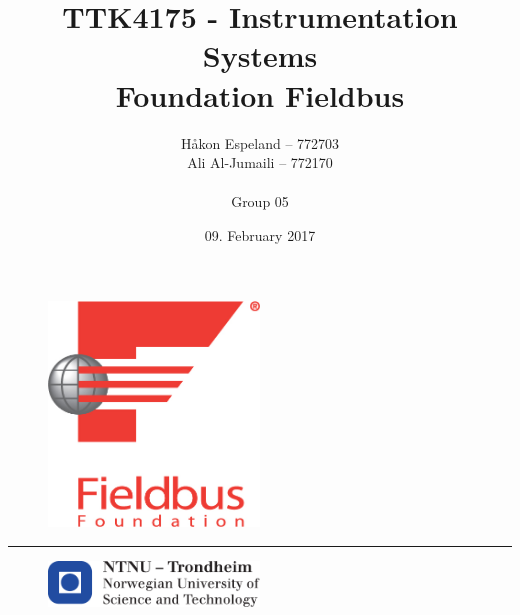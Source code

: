 \documentclass{article}
\title{TTK4175 - Instrumentation Systems\\\Large{\textbf{Foundation Fieldbus}}}
\author{Håkon Espeland -- 772703 \\ Ali Al-Jumaili -- 772170 \\\\ Group 05}
\date{09. February 2017}
\begin{document}
\begin{figure}
    \centering
    \includegraphics[width=0.5\textwidth]{images/fieldbus}
    \end{figure}


\begin{titlepage}
    \maketitle
    \rule{\linewidth}{0.5mm}
    \begin{figure}
    \centering
    \includegraphics[width=0.5\textwidth]{images/logontnu_eng}
    \end{figure}
    \thispagestyle{empty}
\end{titlepage}
\newpage\null\thispagestyle{empty}\newpage
\tableofcontents
\thispagestyle{empty} %
\newpage   

\newpage\null\thispagestyle{empty}\newpage

\setcounter{page}{1}



\end{document}
